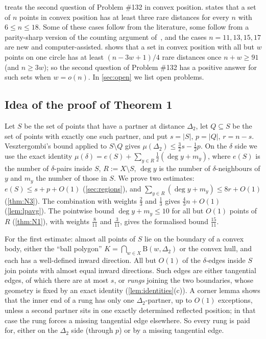 \documentclass[11pt]{amsart}
\theoremstyle{definition}
\theoremstyle{remark}
\newcommand{\Dt}{\Delta_2}
\newcommand{\mult}{\mu}
\newcommand{\Dd}{\mathrm{B}}      %
\begin{document}
 treats the second question of Problem \#132 in convex position.  states that a set of $n$ points in convex position has at least three rare distances for every $n$ with $6\le n\le 18$. Some of these cases follow from the literature, some follow from a parity-sharp version of the counting argument of~\cite{CDL25}, and the cases $n=11,13,15,17$ are new and computer-assisted.  shows that a set in convex position with all but $w$ points on one circle has at least $(n-3w+1)/4$ rare distances once $n+w\ge91$ (and $n\ge3w$); so the second question of Problem \#132 has a positive answer for such sets when $w=o(n)$. In \cref{sec:open} we list open problems.

\subsection*{Idea of the proof of Theorem 1}
Let $S$ be the set of points that have a partner at distance $\Dt$, let $Q\subseteq S$ be the set of points with exactly one such partner, and put $s=|S|$, $p=|Q|$, $r=n-s$. Vesztergombi's bound applied to $S\setminus Q$ gives $\mult(\Dt)\le\frac32s-\frac12p$. On the $\delta$ side we use the exact identity $\mult(\delta)=e(S)+\sum_{y\in R}\frac12(\deg y+m_y)$, where $e(S)$ is the number of $\delta$-pairs inside $S$, $R:=X\setminus S$, $\deg y$ is the number of $\delta$-neighbours of $y$ and $m_y$ the number of those in $S$. We prove two estimates: $e(S)\le s+p+O(1)$ (\cref{sec:regions}), and $\sum_{y\in R}(\deg y+m_y)\le 8r+O(1)$ (\cref{thm:N3}). The combination with weights $\frac23$ and $\frac13$ gives $\frac43n+O(1)$ (\cref{lem:lpavg}). The pointwise bound $\deg y+m_y\le10$ for all but $O(1)$ points of $R$ (\cref{thm:N1}), with weights $\frac8{11}$ and $\frac3{11}$, gives the formalised bound $\frac{15}{11}$.

For the first estimate: almost all points of $S$ lie on the boundary of a convex body, either the ``ball polygon'' $K=\bigcap_{w\in X}\Dd(w,\Dt)$ or the convex hull, and each has a well-defined inward direction. All but $O(1)$ of the $\delta$-edges inside $S$ join points with almost equal inward directions. Such edges are either tangential edges, of which there are at most $s$, or \emph{rungs} joining the two boundaries, whose geometry is fixed by an exact identity (\cref{lem:identities}(c)). A corner lemma shows that the inner end of a rung has only one $\Dt$-partner, up to $O(1)$ exceptions, unless a second partner sits in one exactly determined reflected position; in that case the rung forces a missing tangential edge elsewhere. So every rung is paid for, either on the $\Dt$ side (through $p$) or by a missing tangential edge.
\end{document}

